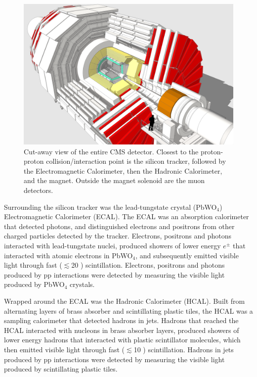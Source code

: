 \begin{figure}[h]
	\centering
	\includegraphics[width=1\textwidth]{figures/cmsDetectorBasic.png}
	\caption{Cut-away view of the entire CMS detector.  Closest to the proton-proton collision/interaction point is the 
		silicon tracker, followed by the Electromagnetic Calorimeter, then the Hadronic Calorimeter, and the 
	magnet.  Outside the magnet solenoid are the muon detectors.}
	\label{fig:layersOfCMS}
\end{figure}


Surrounding the silicon tracker was the lead-tungstate crystal (PbWO$_{4}$) Electromagnetic Calorimeter (ECAL).  
The ECAL was an absorption calorimeter that detected photons, and distinguished electrons and positrons from other charged 
particles detected by the tracker.  Electrons, positrons and photons interacted with lead-tungstate nuclei, 
produced showers of lower energy $e^{\pm}$ that interacted with atomic electrons in PbWO$_{4}$, and subsequently 
emitted visible light through fast ($\lesssim$20 \ns) scintillation.  Electrons, positrons and photons produced 
by pp interactions were detected by measuring the visible light produced by PbWO$_{4}$ crystals.

Wrapped around the ECAL was the Hadronic Calorimeter (HCAL).  Built from alternating layers of brass absorber and 
scintillating plastic tiles, the HCAL was a sampling calorimeter that detected hadrons in jets.  Hadrons that 
reached the HCAL interacted with nucleons in brass absorber layers, produced showers of 
lower energy hadrons that interacted with plastic scintillator molecules, which then emitted visible light through 
fast ($\lesssim$10 \ns) scintillation.  Hadrons in jets produced by pp interactions were detected by measuring the 
visible light produced by scintillating plastic tiles.

